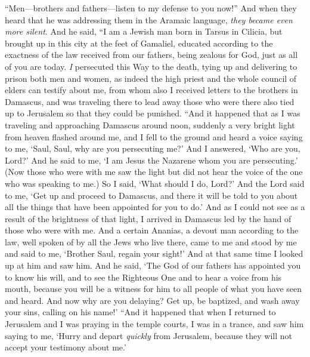 \begin{biblechapter} %
\verse “Men—brothers and fathers—listen to my defense to you now!”
\verse And when they heard that he was addressing them in the Aramaic language, \textit{they became even more silent}. And he said,
\verse “I am a Jewish man born in Tarsus in Cilicia, but brought up in this city at the feet of Gamaliel, educated according to the exactness of the law received from our fathers, being zealous for God, just as all of you are today.
\verse \textit{I} persecuted this Way to the death, tying up and delivering to prison both men and women,
\verse as indeed the high priest and the whole council of elders can testify about me, from whom also I received letters to the brothers in Damascus, and was traveling there to lead away those who were there also tied up to Jerusalem so that they could be punished.
 “And it happened that as I was traveling and approaching Damascus around noon, suddenly a very bright light from heaven flashed around me,
\verse and I fell to the ground and heard a voice saying to me, ‘Saul, Saul, why are you persecuting me?’
\verse And I answered, ‘Who are you, Lord?’ And he said to me, ‘I am Jesus the Nazarene whom you are persecuting.’
\verse (Now those who were with me saw the light but did not hear the voice of the one who was speaking to me.)
\verse So I said, ‘What should I do, Lord?’ And the Lord said to me, ‘Get up and proceed to Damascus, and there it will be told to you about all the things that have been appointed for you to do.’
\verse And as I could not see as a result of the brightness of that light, I arrived in Damascus led by the hand of those who were with me.
\verse And a certain Ananias, a devout man according to the law, well spoken of by all the Jews who live there,
\verse came to me and stood by me and said to me, ‘Brother Saul, regain your sight!’ And at that same time I looked up at him and saw him.
\verse And he said, ‘The God of our fathers has appointed you to know his will, and to see the Righteous One and to hear a voice from his mouth,
\verse because you will be a witness for him to all people of what you have seen and heard.
\verse And now why are you delaying? Get up, be baptized, and wash away your sins, calling on his name!’
\verse “And it happened that when I returned to Jerusalem and I was praying in the temple courts, I was in a trance,
\verse and saw him saying to me, ‘Hurry and depart \textit{quickly} from Jerusalem, because they will not accept your testimony about me.’

\end{biblechapter}
